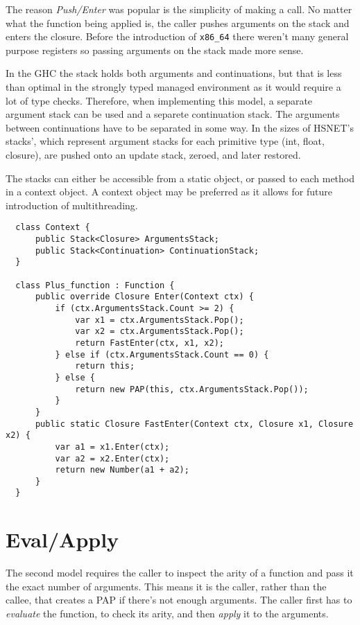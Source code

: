 \documentclass[en]{pracamgr}
\begin{document}
The reason \textit{Push/Enter} was popular is the simplicity of
making a call. No matter what the function being applied is,
the caller pushes arguments on the stack and enters the closure.
Before the introduction of \texttt{x86\_64} there weren't many
general purpose registers so passing arguments on the stack made
more sense.

In the GHC the stack holds both arguments and continuations, but that is
less than optimal in the strongly typed managed environment as it would
require a lot of type checks. Therefore, when implementing this model,
a separate argument stack can be used and a separete continuation stack.
The arguments between continuations have to be
separated in some way. In \cite{Brazil} the sizes of HSNET's stacks',
which represent argument stacks for each primitive type (int, float, closure),
are pushed onto an update stack, zeroed, and later restored.

The stacks can either be accessible from a static object, or passed
to each method in a context object. A context object may be preferred
as it allows for future introduction of multithreading.

\begin{verbatim}
  class Context {
      public Stack<Closure> ArgumentsStack;
      public Stack<Continuation> ContinuationStack;
  }

  class Plus_function : Function {
      public override Closure Enter(Context ctx) {
          if (ctx.ArgumentsStack.Count >= 2) {
              var x1 = ctx.ArgumentsStack.Pop();
              var x2 = ctx.ArgumentsStack.Pop();
              return FastEnter(ctx, x1, x2);
          } else if (ctx.ArgumentsStack.Count == 0) {
              return this;
          } else {
              return new PAP(this, ctx.ArgumentsStack.Pop());
          }
      }
      public static Closure FastEnter(Context ctx, Closure x1, Closure x2) {
          var a1 = x1.Enter(ctx);
          var a2 = x2.Enter(ctx);
          return new Number(a1 + a2);
      }
  }
\end{verbatim}

\section{Eval/Apply}
The second model requires the caller to inspect the arity of a function and
pass it the exact number of arguments. This means it is the caller,
rather than the callee, that creates a PAP if there's not enough arguments.
The caller first has to \textit{evaluate} the function, to check its arity, and then
\textit{apply} it to the arguments.
\end{document}
